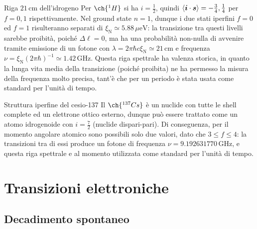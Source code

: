 \begin{example}{Riga $ 21\,\text{cm} $ dell'idrogeno}{}
	Per $ \ch{^1H} $ si ha $ i = \tfrac{1}{2} $, quindi $ \braket{\boldsymbol{i} \cdot \boldsymbol{s}} = - \tfrac{3}{4}, \tfrac{1}{4} $ per $ f = 0,1 $ rispettivamente. Nel ground state $ n = 1 $, dunque i due stati iperfini $ f = 0 $ ed $ f = 1 $ risulteranno separati di $ \xi_\text{N} \simeq 5.88\,\mu\text{eV} $: la transizione tra questi livelli sarebbe proibità, poiché $ \Delta \ell = 0 $, ma ha una probabilità non-nulla di avvenire tramite emissione di un fotone con $ \lambda = 2\pi \hbar c \xi_\text{N} \simeq 21\,\text{cm} $ e frequenza $ \nu = \xi_\text{N} (2\pi \hbar)^{-1} \simeq 1.42\,\text{GHz} $. Questa riga spettrale ha valenza storica, in quanto la lunga vita media della transizione (poiché proibita) ne ha permesso la misura della frequenza molto precisa, tant'è che per un periodo è stata usata come standard per l'unità di tempo.
\end{example}

\begin{example}{Struttura iperfine del cesio-137}{}
	Il $ \ch{^{137}Cs} $ è un nuclide con tutte le shell complete ed un elettrone ottico esterno, dunque può essere trattato come un atomo idrogenoide con $ i = \tfrac{7}{2} $ (nuclide dispari-pari). Di conseguenza, per il momento angolare atomico sono possibili solo due valori, dato che $ 3 \le f \le 4 $: la transizioni tra di essi produce un fotone di frequenza $ \nu = 9.192631770 \,\text{GHz} $, e questa riga spettrale e al momento utilizzata come standard per l'unità di tempo.
\end{example}

\section{Transizioni elettroniche}

\subsection{Decadimento spontaneo}

